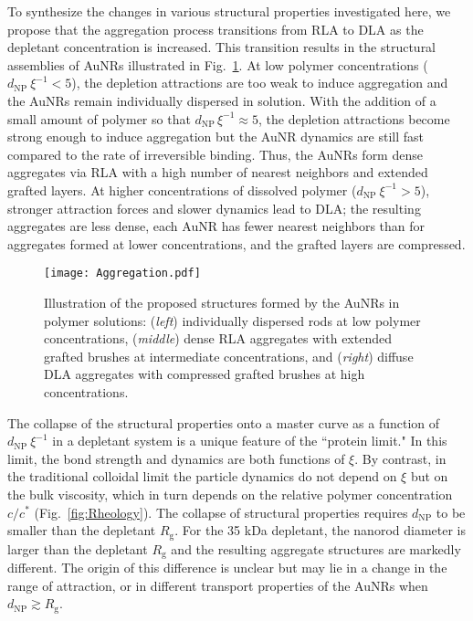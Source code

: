 \documentclass[journal=jacsat, superscriptaddress]{achemso}
\begin{document}
To synthesize the changes in various structural properties investigated here, we propose that the aggregation process transitions from RLA to DLA as the depletant concentration is increased. This transition results in the structural assemblies of AuNRs illustrated in Fig.\ \ref{fig:schematic}. At low polymer concentrations ($d_\mathrm{NP}\: \xi^{-1} < 5$), the depletion attractions are too weak to induce aggregation and the AuNRs remain individually dispersed in solution. With the addition of a small amount of polymer so that $d_\mathrm{NP} \,\xi^{-1} \approx 5$, the depletion attractions become strong enough to induce aggregation but the AuNR dynamics are still fast compared to the rate of irreversible binding. Thus, the AuNRs form dense aggregates via RLA with a high number of nearest neighbors and extended grafted layers. At higher concentrations of dissolved polymer ($d_\mathrm{NP}\: \xi^{-1} > 5$), stronger attraction forces and slower dynamics lead to DLA; the resulting aggregates are less dense, each AuNR has fewer nearest neighbors than for aggregates formed at lower concentrations, and the grafted layers are compressed. 

\begin{figure}[ht!]
\texttt{[image: Aggregation.pdf]}
\caption{\label{fig:schematic} Illustration of the proposed structures formed by the AuNRs in polymer solutions: (\textit{left}) individually dispersed rods at low polymer concentrations, (\textit{middle}) dense RLA aggregates with extended grafted brushes at intermediate concentrations, and (\textit{right}) diffuse DLA aggregates with compressed grafted brushes at high concentrations. }
\end{figure}

The collapse of the structural properties onto a master curve as a function of $d_\mathrm{NP}\:\xi^{-1}$ in a depletant system is a unique feature of the ``protein limit." In this limit, the bond strength and dynamics are both functions of $\xi$. By contrast, in the traditional colloidal limit the particle dynamics do not depend on $\xi$ but on the bulk viscosity,\cite{Squires2010} which in turn depends on the relative polymer concentration $c/c^*$ (Fig.\ \ref{fig:Rheology}). The collapse of structural properties requires $d_\mathrm{NP}$ to be smaller than the depletant $R_\mathrm{g}$. For the 35 kDa depletant, the nanorod diameter is larger than the depletant $R_\mathrm{g}$ and the resulting aggregate structures are markedly different. The origin of this difference is unclear but may lie in a change in the range of attraction,\cite{Poon1998,Zhang2013} or in different transport properties of the AuNRs when $d_\mathrm{NP} \gtrsim R_\mathrm{g}$.\cite{Cai2011} 
\end{document}

